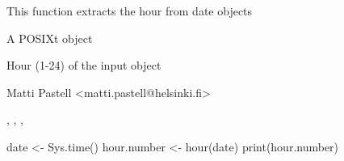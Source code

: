 \documentclass{book}
\begin{document}
\begin{Description}\relax
This function extracts the hour from date objects
\end{Description}
\begin{Arguments}
\begin{ldescription}
\item[\code{x}] A POSIXt object
\end{ldescription}
\end{Arguments}
\begin{Value}
\begin{ldescription}
\item[\code{hour}] Hour (1-24) of the input object
\end{ldescription}
\end{Value}
\begin{Author}\relax
Matti Pastell <matti.pastell@helsinki.fi>
\end{Author}
\begin{SeeAlso}\relax
{}, ,
, 
\end{SeeAlso}
\begin{Examples}
\begin{ExampleCode}
date <- Sys.time()
hour.number <- hour(date)
print(hour.number)
\end{ExampleCode}
\end{Examples}
\end{document}
